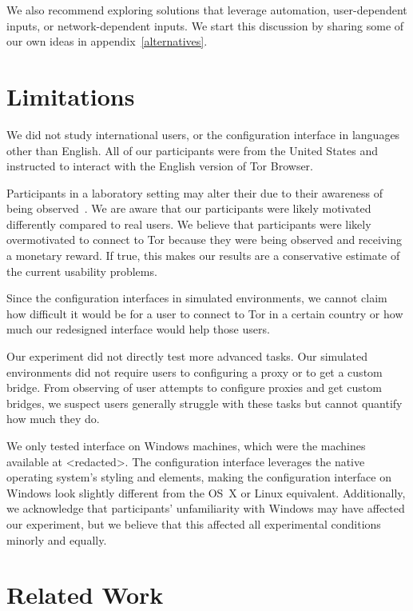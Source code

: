 \documentclass[USenglish,oneside,twocolumn]{article}
\begin{document}
We also recommend exploring solutions that leverage automation, user-dependent inputs, or network-dependent inputs. We start this discussion by sharing some of our own ideas in appendix~\ref{alternatives}. 

\section{Limitations}
\label{sec:limitations}
We did not study international users, or the configuration interface in languages other than English. All of our participants were from the United States and instructed to interact with the English version of Tor Browser.

Participants in a laboratory setting may alter their due to their awareness of being observed~\cite{mccarney2007hawthorne}. We are aware that our participants were likely motivated differently compared to real users. We believe that participants were likely overmotivated to connect to Tor because they were being observed and receiving a monetary reward. If true, this makes our results are a conservative estimate of the current usability problems. 

Since the configuration interfaces in simulated environments, we cannot claim how difficult it would be for a user to connect to Tor in a certain country or how much our redesigned interface would help those users.  

Our experiment did not directly test more advanced tasks. Our simulated environments did not require users to configuring a proxy or to get a custom bridge. From observing of user attempts to configure proxies and get custom bridges, we suspect users generally struggle with these tasks but cannot quantify how much they do. 

We only tested interface on Windows machines, which were the machines available at <redacted>. %
The configuration interface leverages the native operating system's styling and elements, making the configuration interface on Windows look slightly different from the OS~X or Linux equivalent. Additionally, we acknowledge that participants' unfamiliarity with Windows may have affected our experiment, but we believe that this affected all experimental conditions minorly and equally.  

\section{Related Work}
\label{sec:related} 
\end{document}
